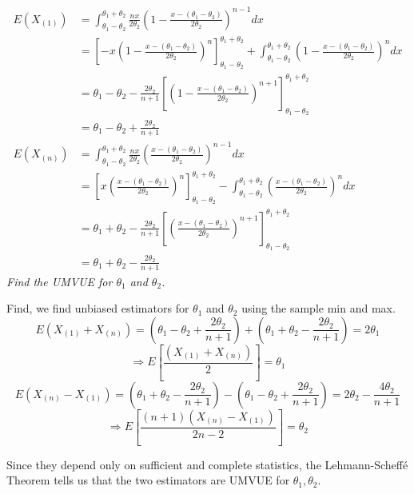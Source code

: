 \documentclass[12pt]{report}
\begin{document}
\begin{align*}
E(X_{(1)}) &= \int_{\theta_1 - \theta_2}^{\theta_1 + \theta_2} \frac{nx}{2 \theta_2} \left( 1-\frac{x-(\theta_1 - \theta_2)}{2 \theta_2} \right)^{n-1} dx \\
	&= \left[ -x\left( 1 - \frac{x - (\theta_1-\theta_2)}{2 \theta_2} \right)^n \right]_{\theta_1 -\theta_2}^{\theta_1 + \theta_2} + \int_{\theta_1 - \theta_2}^{\theta_1 + \theta_2} \left( 1-\frac{x-(\theta_1 - \theta_2)}{2 \theta_2} \right)^{n} dx \\
	&= \theta_1 - \theta_2 - \frac{2 \theta_2}{n+1} \left[ \left( 1 - \frac{x - (\theta_1-\theta_2)}{2 \theta_2} \right)^{n+1} \right]_{\theta_1 -\theta_2}^{\theta_1 + \theta_2} \\
	&= \theta_1 - \theta_2 + \frac{2 \theta_2}{n+1} \\
%
E(X_{(n)}) &= \int_{\theta_1 - \theta_2}^{\theta_1 + \theta_2} \frac{nx}{2 \theta_2} \left( \frac{x-(\theta_1 - \theta_2)}{2 \theta_2} \right)^{n-1} dx \\
	&= \left[ x\left( \frac{x - (\theta_1-\theta_2)}{2 \theta_2} \right)^n \right]_{\theta_1 -\theta_2}^{\theta_1 + \theta_2} - \int_{\theta_1 - \theta_2}^{\theta_1 + \theta_2} \left( \frac{x-(\theta_1 - \theta_2)}{2 \theta_2} \right)^{n} dx \\
	&= \theta_1 + \theta_2 - \frac{2 \theta_2}{n+1} \left[ \left( \frac{x - (\theta_1-\theta_2)}{2 \theta_2} \right)^{n+1} \right]_{\theta_1 -\theta_2}^{\theta_1 + \theta_2} \\
	&= \theta_1 + \theta_2 - \frac{2 \theta_2}{n+1}
\end{align*}
\newline
\newline
\emph{Find the UMVUE for $\theta_1$ and $\theta_2$.}

Find, we find unbiased estimators for $\theta_1$ and $\theta_2$ using the sample min and max.
\[ E( X_{(1)} + X_{(n)} ) = \left( \theta_1 - \theta_2 + \frac{2 \theta_2}{n+1} \right) + \left( \theta_1 + \theta_2 - \frac{2 \theta_2}{n+1} \right) = 2 \theta_1 \]
\[ \Rightarrow E \left[ \frac{( X_{(1)} + X_{(n)} )}{2} \right] = \theta_1 \]
\[ E( X_{(n)} - X_{(1)} ) = \left( \theta_1 + \theta_2 - \frac{2 \theta_2}{n+1} \right) - \left( \theta_1 - \theta_2 + \frac{2 \theta_2}{n+1} \right) = 2 \theta_2 - \frac{4 \theta_2}{n+1} \]
\[ \Rightarrow E \left[ \frac{ (n+1) \left( X_{(n)} - X_{(1)} \right) }{2n-2} \right] = \theta_2 \]

Since they depend only on sufficient and complete statistics, the Lehmann-Scheff\'{e} Theorem tells us that the two estimators are UMVUE for $\theta_1, \theta_2$.
\end{document}
